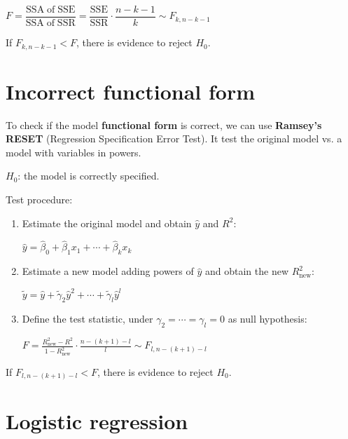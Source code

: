 \documentclass[10pt, a4paper, landscape]{extarticle}
\newcommand{\SSR}{\mathrm{SSR}}
\newcommand{\SSE}{\mathrm{SSE}}
\begin{document}
\begin{multicols}{3}
\begin{center}
	$F = \dfrac{\mathrm{SSA \; of \;} \SSE}{\mathrm{SSA \; of \;} \SSR} = \dfrac{\SSE}{\SSR} \cdot \dfrac{n - k - 1}{k} \sim F_{k, n - k - 1}$
\end{center}

If $F_{k, n - k - 1} < F$, there is evidence to reject $H_0$.

\columnbreak

\section*{Incorrect functional form}

To check if the model \textbf{functional form} is correct, we can use \textbf{Ramsey's RESET} (Regression Specification Error Test). It test the original model vs. a model with variables in powers.

\begin{center}
	$H_0$: the model is correctly specified.
\end{center}

Test procedure:

\begin{enumerate}[leftmargin=*]
	\item Estimate the original model and obtain $\hat{y}$ and $R^2$:
	\begin{center}
		$\hat{y} = \hat{\beta}_0 + \hat{\beta}_1 x_1 + \cdots + \hat{\beta}_k x_k$
	\end{center}
	\item Estimate a new model adding powers of $\hat{y}$ and obtain the new $R^2_{\mathrm{new}}$:
	\begin{center}
		$\tilde{y} = \hat{y} + \tilde{\gamma}_2 \hat{y}^2 + \cdots + \tilde{\gamma}_l \hat{y}^l$
	\end{center}
	\item Define the test statistic, under $\gamma_2 = \cdots = \gamma_l = 0$ as null hypothesis:
	\begin{center}
		$F = \frac{R^2_{\mathrm{new}} - R^2}{1 - R^2_{\mathrm{new}}} \cdot \frac{n - (k + 1) - l}{l} \sim F_{l, n - (k + 1) - l}$
	\end{center}
\end{enumerate}

If $F_{l, n - (k + 1) - l} < F$, there is evidence to reject $H_0$.

\section*{Logistic regression}


\end{multicols}
\end{document}
